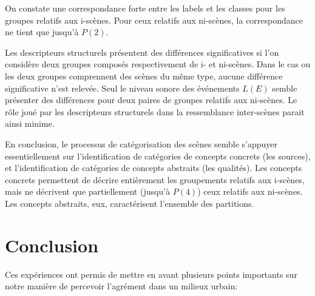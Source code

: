 On constate une correspondance forte entre les labels et les classes pour les groupes relatifs aux i-scènes. Pour ceux relatifs aux ni-scènes, la correspondance ne tient que jusqu'à $P(2)$.

Les descripteurs structurels présentent des différences significatives si l'on considère deux groupes composés respectivement de i- et ni-scènes. Dans le cas ou les deux groupes comprennent des scènes du même type, aucune différence significative n'est relevée. Seul le niveau sonore des événements $L(E)$ semble présenter des différences pour deux paires de groupes relatifs aux ni-scènes. Le rôle joué par les descripteurs structurels dans la ressemblance inter-scènes parait ainsi minime.

En conclusion, le processus de catégorisation des scènes semble s'appuyer essentiellement sur l'identification de catégories de concepts concrets (les sources), et l'identification de catégories de concepts abstraits (les qualités). Les concepts concrets permettent de décrire entièrement les groupements relatifs aux i-scènes, mais ne décrivent que partiellement (jusqu'à $P(4)$) ceux relatifs aux ni-scènes. Les concepts abstraits, eux, caractérisent l'ensemble des partitions.


\section{Conclusion}

Ces expériences ont permis de mettre en avant plusieurs points importants sur notre manière de percevoir l'agrément dans un milieux urbain:


